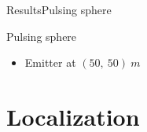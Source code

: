\documentclass[9pt, xcolor={usenames, dvipsnames}]{beamer}
\begin{document}
				\begin{frame}{Results}{Pulsing sphere}
					\centering
					\begin{minipage}[c]{0.4\textwidth}
						\begin{figure}
						\end{figure}
					\end{minipage}
					\hfill
					\begin{minipage}[c]{0.55\textwidth}
						\begin{exampleblock}{Pulsing sphere}
							\begin{itemize}
								\item Emitter at $(50,\ 50)\ m$
							\end{itemize}
						\end{exampleblock}
					\end{minipage}
				\end{frame}

	\part{Localization}
\end{document}
